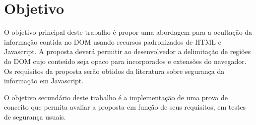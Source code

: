 \section{Objetivo}
O objetivo principal deste trabalho é propor uma abordagem para a ocultação da informação contida no DOM usando recursos padronizados de HTML e Javascript. A proposta deverá permitir ao desenvolvedor a delimitação de regiões do DOM cujo conteúdo seja opaco para \scripts incorporados e extensões do navegador. Os requisitos da proposta serão obtidos da literatura sobre segurança da informação em Javascript.

O objetivo secundário deste trabalho é a implementação de uma prova de conceito que permita avaliar a proposta em função de seus requisitos, em testes de segurança usuais.